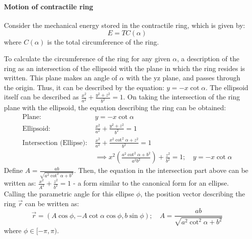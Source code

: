 \paragraph{Motion of contractile ring}
Consider the mechanical energy stored in the contractile ring, which is given by:
\begin{equation} \label{eq:energyDef}
    E = TC(\alpha)
\end{equation}
where $C(\alpha)$ is the total circumference of the ring.

To calculate the circumference of the ring for any given $\alpha$, a description of the ring as an intersection of the ellipsoid with the plane in which the ring resides is written. This plane makes an angle of $\alpha$ with the yz plane, and passes through the origin. Thus, it can be described by the equation: $y = -x\cot\alpha$. The ellipsoid itself can be described as $\frac{x^2}{a^2} + \frac{y^2 + z^2}{b^2} = 1$. On taking the intersection of the ring plane with the ellipsoid, the equation describing the ring can be obtained:
\begin{align*}
    \textrm{Plane: }&y = -x\cot\alpha \\
    \textrm{Ellipsoid: }&\frac{x^2}{a^2} + \frac{y^2 + z^2}{b^2} = 1 \\
    \textrm{Intersection (Ellipse): }&\frac{x^2}{a^2} + \frac{x^2\cot^2\alpha + z^2}{b^2} = 1\\
    &\implies x^2\left(\frac{a^2\cot^2\alpha + b^2}{a^2b^2}\right) + \frac{z^2}{b^2} = 1; \quad y = -x\cot\alpha
\end{align*}
Define $A = \frac{ab}{\sqrt{a^2\cot^2\alpha + b^2}}$. Then, the equation in the intersection part above can be written as: $\frac{x^2}{A^2} + \frac{z^2}{b^2} = 1$ - a form similar to the canonical form for an ellipse. Calling the parametric angle for this ellipse $\phi$, the position vector describing the ring $\Vec{r}$ can be written as:
\begin{equation*}
    \Vec{r} = \left(A\cos\phi,-A\cot\alpha\cos\phi,b\sin\phi\right); \quad A = \frac{ab}{\sqrt{a^2\cot^2\alpha + b^2}}
\end{equation*}
where $\phi \in [-\pi,\pi)$.

